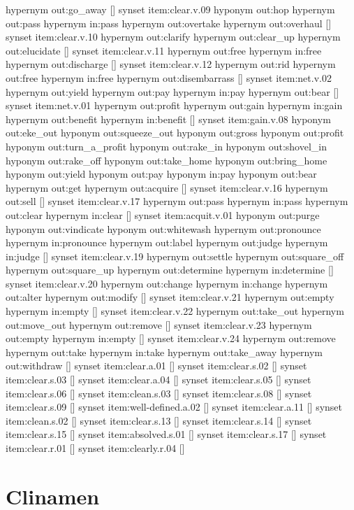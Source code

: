 \begin{draft}
hypernym out:go\_away
[]
synset item:clear.v.09
hyponym out:hop
hypernym out:pass
hypernym in:pass
hypernym out:overtake
hypernym out:overhaul
[]
synset item:clear.v.10
hypernym out:clarify
hypernym out:clear\_up
hypernym out:elucidate
[]
synset item:clear.v.11
hypernym out:free
hypernym in:free
hypernym out:discharge
[]
synset item:clear.v.12
hypernym out:rid
hypernym out:free
hypernym in:free
hypernym out:disembarrass
[]
synset item:net.v.02
hypernym out:yield
hypernym out:pay
hypernym in:pay
hypernym out:bear
[]
synset item:net.v.01
hypernym out:profit
hypernym out:gain
hypernym in:gain
hypernym out:benefit
hypernym in:benefit
[]
synset item:gain.v.08
hyponym out:eke\_out
hyponym out:squeeze\_out
hyponym out:gross
hyponym out:profit
hyponym out:turn\_a\_profit
hyponym out:rake\_in
hyponym out:shovel\_in
hyponym out:rake\_off
hyponym out:take\_home
hyponym out:bring\_home
hyponym out:yield
hyponym out:pay
hyponym in:pay
hyponym out:bear
hypernym out:get
hypernym out:acquire
[]
synset item:clear.v.16
hypernym out:sell
[]
synset item:clear.v.17
hypernym out:pass
hypernym in:pass
hypernym out:clear
hypernym in:clear
[]
synset item:acquit.v.01
hyponym out:purge
hyponym out:vindicate
hyponym out:whitewash
hypernym out:pronounce
hypernym in:pronounce
hypernym out:label
hypernym out:judge
hypernym in:judge
[]
synset item:clear.v.19
hypernym out:settle
hypernym out:square\_off
hypernym out:square\_up
hypernym out:determine
hypernym in:determine
[]
synset item:clear.v.20
hypernym out:change
hypernym in:change
hypernym out:alter
hypernym out:modify
[]
synset item:clear.v.21
hypernym out:empty
hypernym in:empty
[]
synset item:clear.v.22
hypernym out:take\_out
hypernym out:move\_out
hypernym out:remove
[]
synset item:clear.v.23
hypernym out:empty
hypernym in:empty
[]
synset item:clear.v.24
hypernym out:remove
hypernym out:take
hypernym in:take
hypernym out:take\_away
hypernym out:withdraw
[]
synset item:clear.a.01
[]
synset item:clear.s.02
[]
synset item:clear.s.03
[]
synset item:clear.a.04
[]
synset item:clear.s.05
[]
synset item:clear.s.06
[]
synset item:clean.s.03
[]
synset item:clear.s.08
[]
synset item:clear.s.09
[]
synset item:well-defined.a.02
[]
synset item:clear.a.11
[]
synset item:clean.s.02
[]
synset item:clear.s.13
[]
synset item:clear.s.14
[]
synset item:clear.s.15
[]
synset item:absolved.s.01
[]
synset item:clear.s.17
[]
synset item:clear.r.01
[]
synset item:clearly.r.04
[]
\end{draft}

\section{Clinamen}

